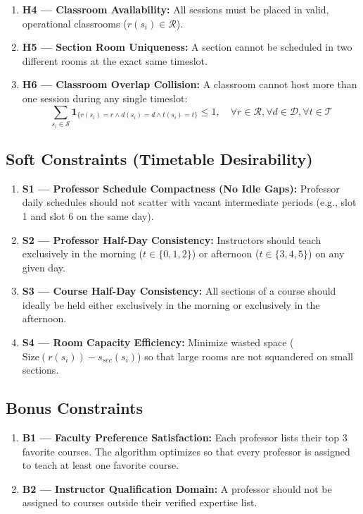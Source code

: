 \documentclass[12pt,a4paper]{report}
\begin{document}
\begin{enumerate}[leftmargin=2.0em]
  \item \textbf{H4 --- Classroom Availability:}
  All sessions must be placed in valid, operational classrooms ($r(s_i) \in \mathcal{R}$).

  \item \textbf{H5 --- Section Room Uniqueness:}
  A section cannot be scheduled in two different rooms at the exact same timeslot.

  \item \textbf{H6 --- Classroom Overlap Collision:}
  A classroom cannot host more than one session during any single timeslot:
  \begin{equation}
    \sum_{s_i \in \mathcal{S}} \mathbf{1}_{\{r(s_i) = r \land d(s_i) = d \land t(s_i) = t\}} \le 1, \quad \forall r \in \mathcal{R}, \forall d \in \mathcal{D}, \forall t \in \mathcal{T}
  \end{equation}
\end{enumerate}

\subsection{Soft Constraints (Timetable Desirability)}
\begin{enumerate}[leftmargin=2.0em]
  \item \textbf{S1 --- Professor Schedule Compactness (No Idle Gaps):}
  Professor daily schedules should not scatter with vacant intermediate periods (e.g., slot 1 and slot 6 on the same day).
  \item \textbf{S2 --- Professor Half-Day Consistency:}
  Instructors should teach exclusively in the morning ($t \in \{0, 1, 2\}$) or afternoon ($t \in \{3, 4, 5\}$) on any given day.
  \item \textbf{S3 --- Course Half-Day Consistency:}
  All sections of a course should ideally be held either exclusively in the morning or exclusively in the afternoon.
  \item \textbf{S4 --- Room Capacity Efficiency:}
  Minimize wasted space ($\text{Size}(r(s_i)) - s_{sec}(s_i)$) so that large rooms are not squandered on small sections.
\end{enumerate}

\subsection{Bonus Constraints}
\begin{enumerate}[leftmargin=2.0em]
  \item \textbf{B1 --- Faculty Preference Satisfaction:}
  Each professor lists their top 3 favorite courses. The algorithm optimizes so that every professor is assigned to teach at least one favorite course.
  \item \textbf{B2 --- Instructor Qualification Domain:}
  A professor should not be assigned to courses outside their verified expertise list.
\end{enumerate}
\end{document}
